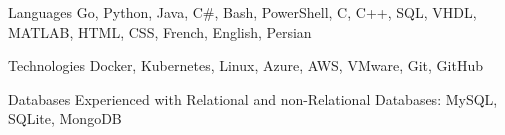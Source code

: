 
\begin{cvskills}
  \cvskill
    {Languages} %
    {Go, Python, Java, C\#, Bash, PowerShell, C, C++, SQL, VHDL, MATLAB, HTML, CSS, French, English, Persian} %

  \cvskill
    {Technologies} %
    {Docker, Kubernetes, Linux, Azure, AWS, VMware, Git, GitHub} %

  \cvskill
    {Databases} %
    {Experienced with Relational and non-Relational Databases: MySQL, SQLite, MongoDB} %

\end{cvskills}
